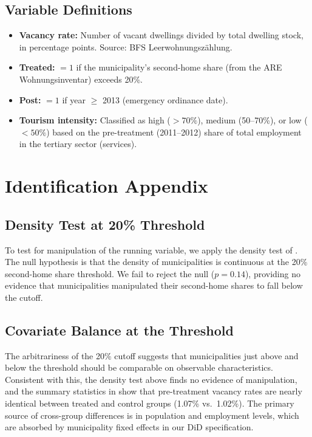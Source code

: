 \documentclass[12pt]{article}
\begin{document}
\subsection{Variable Definitions}

\begin{itemize}
    \item \textbf{Vacancy rate:} Number of vacant dwellings divided by total dwelling stock, in percentage points. Source: BFS Leerwohnungsz\"{a}hlung.
    \item \textbf{Treated:} $= 1$ if the municipality's second-home share (from the ARE Wohnungsinventar) exceeds 20\%.
    \item \textbf{Post:} $= 1$ if year $\geq$ 2013 (emergency ordinance date).
    \item \textbf{Tourism intensity:} Classified as high ($>70\%$), medium (50--70\%), or low ($<50\%$) based on the pre-treatment (2011--2012) share of total employment in the tertiary sector (services).
\end{itemize}


\section{Identification Appendix}
\label{app:identification}

\subsection{Density Test at 20\% Threshold}

To test for manipulation of the running variable, we apply the density test of \citet{cattaneo2020simple}. The null hypothesis is that the density of municipalities is continuous at the 20\% second-home share threshold. We fail to reject the null ($p = 0.14$), providing no evidence that municipalities manipulated their second-home shares to fall below the cutoff.

\subsection{Covariate Balance at the Threshold}

The arbitrariness of the 20\% cutoff suggests that municipalities just above and below the threshold should be comparable on observable characteristics. Consistent with this, the density test above finds no evidence of manipulation, and the summary statistics in  show that pre-treatment vacancy rates are nearly identical between treated and control groups (1.07\% vs.\ 1.02\%). The primary source of cross-group differences is in population and employment levels, which are absorbed by municipality fixed effects in our DiD specification.
\end{document}
